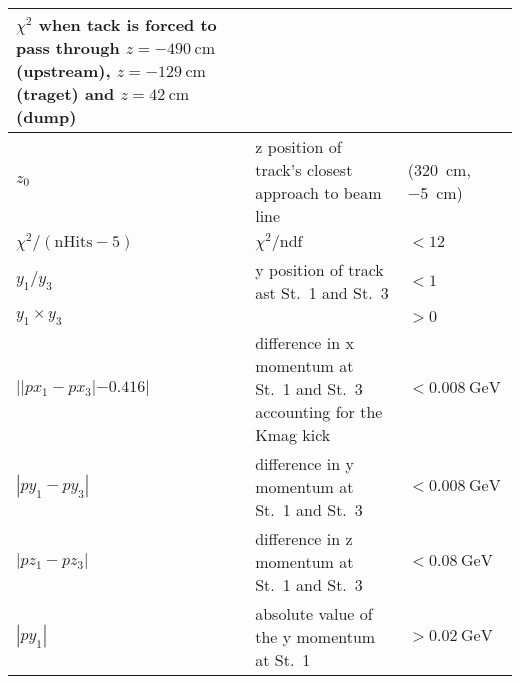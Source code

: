 \documentclass[../main.tex]{subfiles}
\begin{document}
\begin{table}[ht!]
\begin{tabular}{|m{4.5cm}|m{7cm}|m{3cm}|}
		$\chi^2$ when tack is   forced to pass through $z=\SI{-490}{\cm}$(upstream), $z=\SI{-129}{\cm}$(traget) and   $z=\SI{42}{\cm}$(dump) &
		\\ \hline
		$z_0$                                                                                                                                & z position of track's closest approach to beam   line                                & (\SI{320}{\cm},\SI{-5}{\cm}) \\ \hline
		$\chi^2/(\mathrm{nHits}-5)$                                                                                                          & $\chi^2/\mathrm{ndf}$                                                                & $<12$                        \\ \hline
		$y_1/y_3$                                                                                                                            & y position of track ast St.~1   and St.~3                                            & $<1$                         \\ \hline
		$y_1\times y_3$                                                                                                                      &                                                                                      & $>0$                         \\ \hline
		$| |px_1 - px_3| -0.416|$                                                                                                            & difference in x momentum at St.~1 and St.~3 accounting for the Kmag kick             & $<\SI{0.008}{\GeV}$          \\ \hline
		$|py_1 - py_3|$                                                                                                                      & difference in y momentum at St.~1 and St.~3                                          & $<\SI{0.008}{\GeV}$          \\ \hline
		$|pz_1 - pz_3|$                                                                                                                      & difference in z momentum at St.~1 and St.~3                                          & $<\SI{0.08}{\GeV}$           \\ \hline
		$|py_1 |$                                                                                                                            & absolute value of the y momentum   at St.~1                                          & $>\SI{0.02}{\GeV}$           \\ \hline
	\end{tabular}
\end{table}
\end{document}
